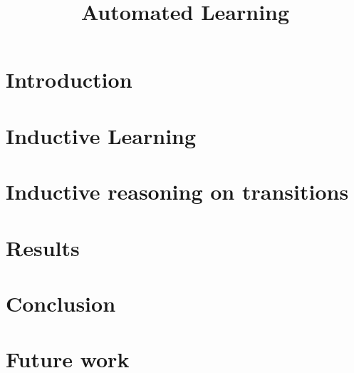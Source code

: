 \documentclass[english]{report}
\title {Automated Learning}
\theoremstyle{plain}
\theoremstyle{definition}
\begin{document}
\maketitle
\tableofcontents
\chapter{Introduction}
	

\chapter{Inductive Learning}
    

\chapter{Inductive reasoning on transitions}
    

\chapter{Results}

\chapter{Conclusion}

\chapter{Future work}

{}

\end{document}
